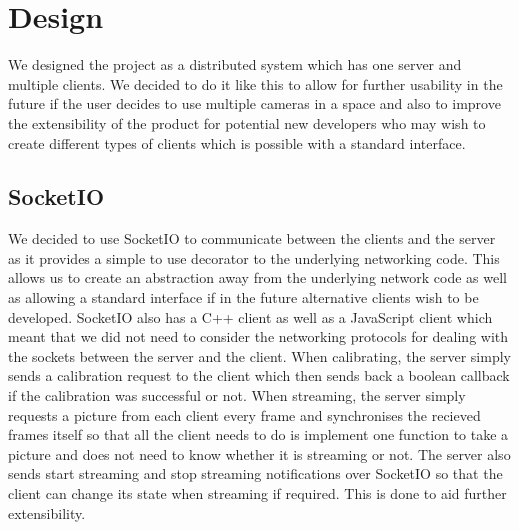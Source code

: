 \documentclass{article}
\begin{document}
\section{Design}
We designed the project as a distributed system which has one server and multiple clients. We decided to do it like this to allow for further usability in the future if the user decides to use multiple cameras in a space and also to improve the extensibility of the product for potential new developers who may wish to create different types of clients which is possible with a standard interface.

\subsection{SocketIO}
We decided to use SocketIO to communicate between the clients and the server as it provides a simple to use decorator to the underlying networking code. This allows us to create an abstraction away from the underlying network code as well as allowing a standard interface if in the future alternative clients wish to be developed. SocketIO also has a C++ client as well as a JavaScript client which meant that we did not need to consider the networking protocols for dealing with the sockets between the server and the client. When calibrating, the server simply sends a calibration request to the client which then sends back a boolean callback if the calibration was successful or not. When streaming, the server simply requests a picture from each client every frame and synchronises the recieved frames itself so that all the client needs to do is implement one function to take a picture and does not need to know whether it is streaming or not. The server also sends start streaming and stop streaming notifications over SocketIO so that the client can change its state when streaming if required. This is done to aid further extensibility.
\end{document}
